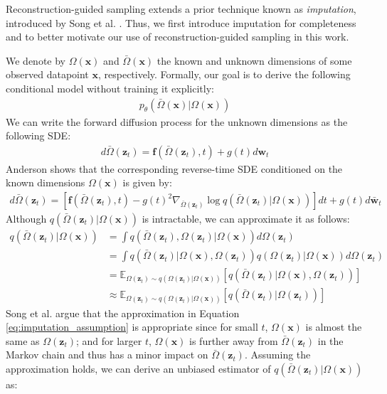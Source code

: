 \documentclass[ oneside,%
                    author={George Herbert},
                    degree={MSci},
                     title={Diffusion Models for Time-Evolving Precipitation Fields},
                  subtitle={}]{dissertation}
\begin{document}
Reconstruction-guided sampling extends a prior technique known as \textit{imputation}, introduced by Song et al. \cite{Score_Based_Song}. Thus, we first introduce imputation for completeness and to better motivate our use of reconstruction-guided sampling in this work.

We denote by $\Omega(\mathbf{x})$ and $\bar\Omega(\mathbf{x})$ the known and unknown dimensions of some observed datapoint $\mathbf{x}$, respectively. Formally, our goal is to derive the following conditional model without training it explicitly:
\begin{align}
      p_\theta(\bar\Omega(\mathbf{x})|\Omega(\mathbf{x}))
\end{align}
We can write the forward diffusion process for the unknown dimensions as the following SDE:
\begin{align}
      d\bar\Omega(\mathbf{z}_t)=\mathbf{f}(\bar\Omega(\mathbf{z}_t), t) + g(t)d\mathbf{w}_t
\end{align}
Anderson \cite{Reverse_Time_Diffusion_Anderson} shows that the corresponding reverse-time SDE conditioned on the known dimensions $\Omega(\mathbf{x})$ is given by:
\begin{align}
      d\bar\Omega(\mathbf{z}_t)=\left[\mathbf{f}(\bar\Omega(\mathbf{z}_t), t) - g(t)^2\nabla_{\bar\Omega(\mathbf{z}_t)}\log q(\bar\Omega(\mathbf{z}_t)|\Omega(\mathbf{x}))\right]dt + g(t)d \bar{\mathbf{w}}_t\label{eq:recon_reverse_sde}
\end{align}
Although $q(\bar\Omega(\mathbf{z}_t)|\Omega(\mathbf{x}))$ is intractable, we can approximate it as follows:
\begin{align}
      q(\bar\Omega(\mathbf{z}_t)|\Omega(\mathbf{x}))&=\int q(\bar\Omega(\mathbf{z}_t), \Omega(\mathbf{z}_t)|\Omega(\mathbf{x}))d\Omega(\mathbf{z}_t)\\
      &=\int q(\bar\Omega(\mathbf{z}_t)|\Omega(\mathbf{x}), \Omega(\mathbf{z}_t))q(\Omega(\mathbf{z}_t)|\Omega(\mathbf{x})) d\Omega(\mathbf{z}_t)\\
      &=\mathbb{E}_{\Omega(\mathbf{z}_t)\sim q(\Omega(\mathbf{z}_t)|\Omega(\mathbf{x}))}\left[q(\bar\Omega(\mathbf{z}_t)|\Omega(\mathbf{x}), \Omega(\mathbf{z}_t))\right]\\
      &\approx \mathbb{E}_{\Omega(\mathbf{z}_t)\sim q(\Omega(\mathbf{z}_t)|\Omega(\mathbf{x}))}\left[q(\bar\Omega(\mathbf{z}_t)| \Omega(\mathbf{z}_t))\right]\label{eq:imputation_assumption}
\end{align}
Song et al. \cite{Score_Based_Song} argue that the approximation in Equation \ref{eq:imputation_assumption} is appropriate since for small $t$, $\Omega(\mathbf{x})$ is almost the same as $\Omega(\mathbf{z}_t)$; and for larger $t$, $\Omega(\mathbf{x})$ is further away from $\bar\Omega(\mathbf{z}_t)$ in the Markov chain and thus has a minor impact on $\bar\Omega(\mathbf{z}_t)$. Assuming the approximation holds, we can derive an unbiased estimator of $q(\bar\Omega(\mathbf{z}_t)|\Omega(\mathbf{x}))$ as:
\end{document}
